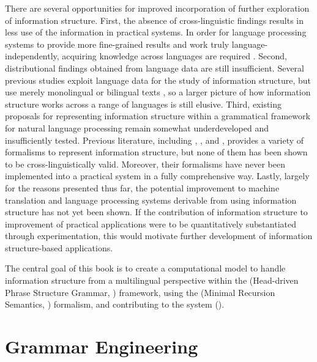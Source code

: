 There are several opportunities for improved incorporation of further
exploration of information structure.  First, the absence of
cross-linguistic findings results in less use of the information in
practical systems.  In order for language processing systems to
provide more fine-grained results and work truly
language-independently, acquiring knowledge across languages are
required \citep{bender:11}.  Second, distributional findings obtained
from language data are still insufficient. Several previous studies
exploit language data for the study of information structure, but use
merely monolingual or bilingual texts
\citep{komagata:99,johansson:01,bouma:etal:10,hasegawa:koenig:11}, so
a larger picture of how information structure works across a range of
languages is still elusive.  Third, existing proposals for
representing information structure within a grammatical framework for
natural language processing remain somewhat underdeveloped and
insufficiently tested.  Previous literature, including
\citet{king:97}, \citet{steedman:00}, and \citet{bildhauer:07},
provides a variety of formalisms to represent information structure,
but none of them has been shown to be cross-linguistically
valid. Moreover, their formalisms have never been implemented into a
practical system in a fully comprehensive way.  Lastly, largely for
the reasons presented thus far, the potential improvement to machine
translation and language processing systems derivable from using
information structure has not yet been shown. If the contribution of
information structure to improvement of practical applications were to
be quantitatively substantiated through experimentation, this would
motivate further development of information structure-based
applications.


The central goal of this book is to create a computational model to
handle information structure from a multilingual perspective within
the  (Head-driven Phrase Structure Grammar,
\citealt{pollard:sag:94}) framework, using the  (Minimal
Recursion Semantics, \citealt{copestake:etal:05}) formalism, and
contributing to the \lingo {} system
(\citealt{bender:etal:10}).



\section{Grammar Engineering}
\label{2:sec:grammar-engineering}



